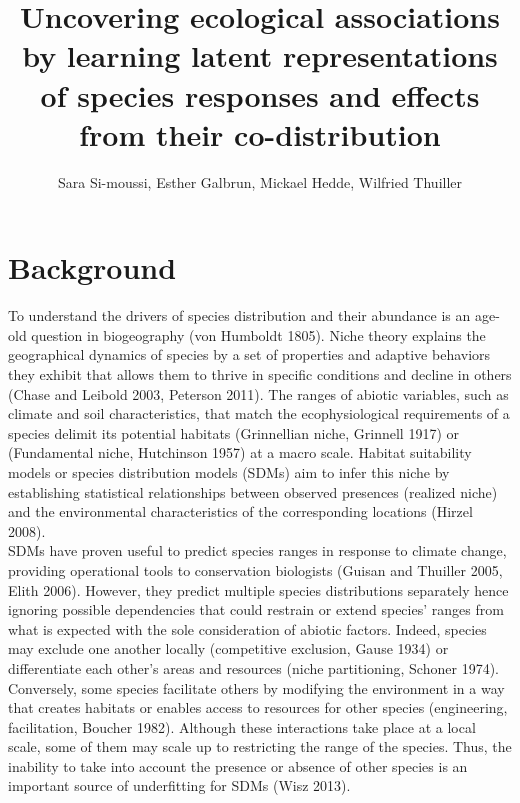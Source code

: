 \documentclass[]{article}
\title{Uncovering ecological associations by learning latent representations of species responses and effects from their co-distribution}
\author{Sara Si-moussi, Esther Galbrun, Mickael Hedde, Wilfried Thuiller}
\begin{document}
\maketitle

\section{Background}
To understand the drivers of species distribution and their abundance is an age-old question in biogeography (von Humboldt 1805). Niche theory explains the geographical dynamics of species by a set of properties and adaptive behaviors they exhibit that allows them to thrive in specific conditions and decline in others (Chase and Leibold 2003, Peterson 2011). The ranges of abiotic variables, such as climate and soil characteristics, that match the ecophysiological requirements of a species delimit its potential habitats (Grinnellian niche, Grinnell 1917) or (Fundamental niche, Hutchinson 1957) at a macro scale.  Habitat suitability models or species distribution models (SDMs) aim to infer this niche by establishing statistical relationships between observed presences (realized niche) and the environmental characteristics of the corresponding locations (Hirzel 2008). \\

\noindent SDMs have proven useful to predict species ranges in response to climate change, providing operational tools to conservation biologists (Guisan and Thuiller 2005, Elith 2006). However, they predict multiple species distributions separately hence ignoring possible dependencies that could restrain or extend species' ranges from what is expected with the sole consideration of abiotic factors.  Indeed, species may exclude one another locally (competitive exclusion, Gause 1934) or differentiate each other’s areas and resources (niche partitioning, Schoner 1974). Conversely, some species facilitate others by modifying the environment in a way that creates habitats or enables access to resources for other species (engineering, facilitation, Boucher 1982).  Although these interactions take place at a local scale, some of them may scale up to restricting the range of the species.  Thus, the inability to take into account the presence or absence of other species is an important source of underfitting for SDMs (Wisz 2013). \\
\end{document}
